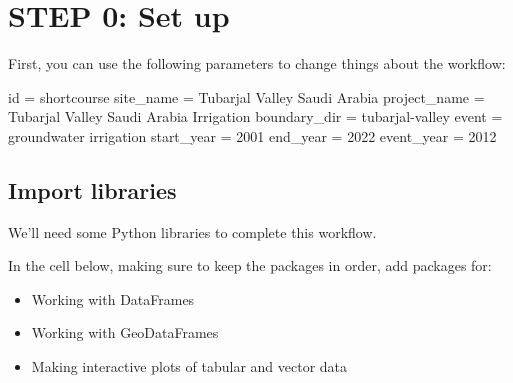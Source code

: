 \documentclass[
  letterpaper,
  DIV=11,
  numbers=noendperiod,
  oneside]{scrreprt}
\newenvironment{Shaded}{\begin{snugshade}}{\end{snugshade}}
\newcommand{\BuiltInTok}[1]{\textcolor[rgb]{0.00,0.23,0.31}{#1}}
\newcommand{\NormalTok}[1]{\textcolor[rgb]{0.00,0.23,0.31}{#1}}
\newcommand{\OperatorTok}[1]{\textcolor[rgb]{0.37,0.37,0.37}{#1}}
\newcommand{\StringTok}[1]{\textcolor[rgb]{0.13,0.47,0.30}{#1}}
\providecommand{\tightlist}{%
  \setlength{\itemsep}{0pt}\setlength{\parskip}{0pt}}
\begin{document}

\chapter{STEP 0: Set up}\label{step-0-set-up-2}

First, you can use the following parameters to change things about the
workflow:

\begin{Shaded}
\begin{Highlighting}[]
\BuiltInTok{id} \OperatorTok{=} \StringTok{\textquotesingle{}shortcourse\textquotesingle{}}
\NormalTok{site\_name }\OperatorTok{=} \StringTok{\textquotesingle{}Tubarjal Valley Saudi Arabia\textquotesingle{}}
\NormalTok{project\_name }\OperatorTok{=} \StringTok{\textquotesingle{}Tubarjal Valley Saudi Arabia Irrigation\textquotesingle{}}
\NormalTok{boundary\_dir }\OperatorTok{=} \StringTok{\textquotesingle{}tubarjal{-}valley\textquotesingle{}}
\NormalTok{event }\OperatorTok{=} \StringTok{\textquotesingle{}groundwater irrigation\textquotesingle{}}
\NormalTok{start\_year }\OperatorTok{=} \StringTok{\textquotesingle{}2001\textquotesingle{}}
\NormalTok{end\_year }\OperatorTok{=} \StringTok{\textquotesingle{}2022\textquotesingle{}}
\NormalTok{event\_year }\OperatorTok{=} \StringTok{\textquotesingle{}2012\textquotesingle{}}
\end{Highlighting}
\end{Shaded}

\section{Import libraries}\label{import-libraries-2}

We'll need some Python libraries to complete this workflow.

\begin{tcolorbox}[enhanced jigsaw, colbacktitle=quarto-callout-color!10!white, opacityback=0, bottomtitle=1mm, toptitle=1mm, bottomrule=.15mm, left=2mm, colframe=quarto-callout-color-frame, leftrule=.75mm, opacitybacktitle=0.6, colback=white, rightrule=.15mm, toprule=.15mm, breakable, titlerule=0mm, title=\textcolor{quarto-callout-color}{\faInfo}\hspace{0.5em}{Try It: Import necessary libraries}, coltitle=black, arc=.35mm]

In the cell below, making sure to keep the packages in order, add
packages for:

\begin{itemize}
\tightlist
\item
  Working with DataFrames
\item
  Working with GeoDataFrames
\item
  Making interactive plots of tabular and vector data
\end{itemize}

\end{tcolorbox}
\end{document}
